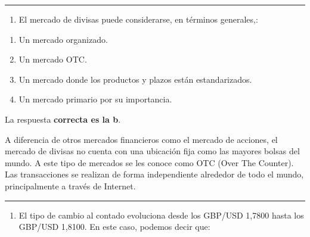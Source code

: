 \documentclass[
  letterpaper,
  DIV=11,
  numbers=noendperiod]{scrreprt}
\providecommand{\tightlist}{%
  \setlength{\itemsep}{0pt}\setlength{\parskip}{0pt}}\usepackage{longtable,booktabs,array}
\begin{document}
\begin{center}\rule{0.5\linewidth}{0.5pt}\end{center}

\begin{enumerate}
\def\labelenumi{\arabic{enumi}.}
\setcounter{enumi}{18}
\tightlist
\item
  El mercado de divisas puede considerarse, en términos generales,:
\end{enumerate}

\begin{enumerate}
\def\labelenumi{\alph{enumi})}
\item
  Un mercado organizado.
\item
  Un mercado OTC.
\item
  Un mercado donde los productos y plazos están estandarizados.
\item
  Un mercado primario por su importancia.
\end{enumerate}

\begin{tcolorbox}[enhanced jigsaw, left=2mm, opacityback=0, colback=white, breakable, arc=.35mm, bottomrule=.15mm, rightrule=.15mm, toprule=.15mm, leftrule=.75mm, colframe=quarto-callout-tip-color-frame]
\begin{minipage}[t]{5.5mm}
\textcolor{quarto-callout-tip-color}{\faLightbulb}
\end{minipage}%
\begin{minipage}[t]{\textwidth - 5.5mm}

La respuesta \textbf{correcta es la b}.

A diferencia de otros mercados financieros como el mercado de acciones,
el mercado de divisas no cuenta con una ubicación fija como las mayores
bolsas del mundo. A este tipo de mercados se les conoce como OTC (Over
The Counter). Las transacciones se realizan de forma independiente
alrededor de todo el mundo, principalmente a través de Internet.

\end{minipage}%
\end{tcolorbox}

\begin{center}\rule{0.5\linewidth}{0.5pt}\end{center}

\begin{enumerate}
\def\labelenumi{\arabic{enumi}.}
\setcounter{enumi}{19}
\tightlist
\item
  El tipo de cambio al contado evoluciona desde los GBP/USD 1,7800 hasta
  los GBP/USD 1,8100. En este caso, podemos decir que:
\end{enumerate}
\end{document}

